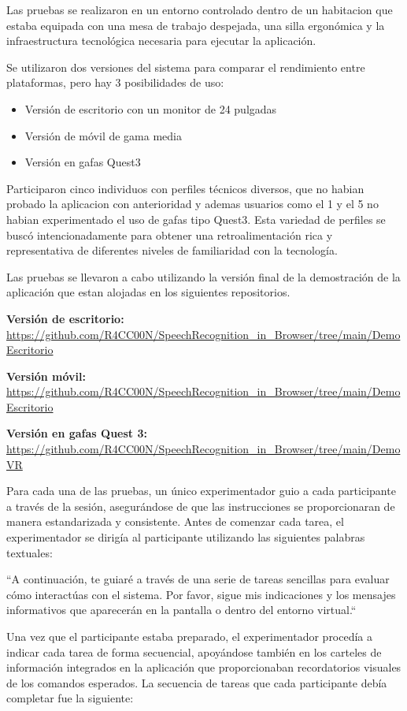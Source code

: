 \documentclass[a4paper, 12pt]{book}
\begin{document}
Las pruebas se realizaron en un entorno controlado dentro de un habitacion que estaba equipada con una mesa de trabajo despejada, una silla ergonómica y la infraestructura tecnológica necesaria para ejecutar la aplicación.

Se utilizaron dos versiones del sistema para comparar el rendimiento entre plataformas, pero hay 3 posibilidades de uso:
\begin{itemize}
 \item Versión de escritorio con un monitor de 24 pulgadas
 \item Versión de móvil de gama media
 \item Versión en gafas Quest3 
\end{itemize}

Participaron cinco individuos con perfiles técnicos diversos, que no habian probado la aplicacion con anterioridad y ademas usuarios como el 1 y el 5 no habian experimentado el uso de gafas tipo Quest3. 
Esta variedad de perfiles se buscó intencionadamente para obtener una retroalimentación rica y representativa de diferentes niveles de familiaridad con la tecnología.


Las pruebas se llevaron a cabo utilizando la versión final de la demostración de la aplicación que estan alojadas en los siguientes repositorios.

\textbf{Versión de escritorio:} \url{https://github.com/R4CC00N/SpeechRecognition_in_Browser/tree/main/DemoEscritorio}

\textbf{Versión móvil:} \url{https://github.com/R4CC00N/SpeechRecognition_in_Browser/tree/main/DemoEscritorio}

\textbf{Versión en gafas Quest 3:} \url{https://github.com/R4CC00N/SpeechRecognition_in_Browser/tree/main/DemoVR}

Para cada una de las pruebas, un único experimentador guio a cada participante a través de la sesión, asegurándose de que las instrucciones se proporcionaran de manera estandarizada y consistente. 
Antes de comenzar cada tarea, el experimentador se dirigía al participante utilizando las siguientes palabras textuales:

``A continuación, te guiaré a través de una serie de tareas sencillas para evaluar cómo interactúas con el sistema. Por favor, sigue mis indicaciones y los mensajes informativos que aparecerán en la pantalla o dentro del entorno virtual.``

Una vez que el participante estaba preparado, el experimentador procedía a indicar cada tarea de forma secuencial, apoyándose también en los carteles de información integrados en la aplicación que proporcionaban recordatorios visuales de los comandos esperados. La secuencia de tareas que cada participante debía completar fue la siguiente:
\end{document}
